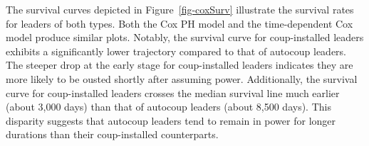 \documentclass[
  12pt,
]{report}
\begin{document}
The survival curves depicted in Figure~\ref{fig-coxSurv} illustrate the
survival rates for leaders of both types. Both the Cox PH model and the
time-dependent Cox model produce similar plots. Notably, the survival
curve for coup-installed leaders exhibits a significantly lower
trajectory compared to that of autocoup leaders. The steeper drop at the
early stage for coup-installed leaders indicates they are more likely to
be ousted shortly after assuming power. Additionally, the survival curve
for coup-installed leaders crosses the median survival line much earlier
(about 3,000 days) than that of autocoup leaders (about 8,500 days).
This disparity suggests that autocoup leaders tend to remain in power
for longer durations than their coup-installed counterparts.

\begin{figure}

\begin{minipage}{0.50\linewidth}



\end{minipage}%
%
\begin{minipage}{0.50\linewidth}

\end{minipage}
\end{figure}
\end{document}
